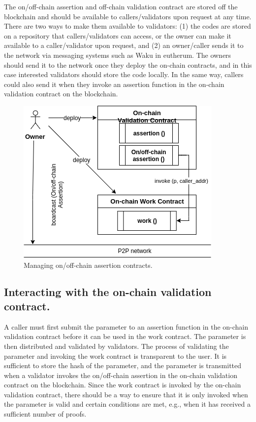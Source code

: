 \documentclass[runningheads]{llncs}
\begin{document}
The on/off-chain assertion and off-chain validation contract are stored off the blockchain and should be available to callers/validators upon request at any time. There are two ways to make them available to validators: (1) the codes are stored on a repository that callers/validators can access, or the owner can make it available to a caller/validator upon request, and (2) an owner/caller sends it to the network via messaging systems such as Waku in eutherum. The owners should send it to the network once they deploy the on-chain contracts, and in this case interested validators should store the code locally. In the same way, callers could also send it when they invoke an assertion function in the on-chain validation contract on the blockchain.

\begin{figure}
\centering
\includegraphics[scale=.8]{owner}
\caption{Managing on/off-chain assertion contracts.}
\end{figure}

\subsection{Interacting with the on-chain validation contract.}
A caller must first submit the parameter to an assertion function in the on-chain validation contract before it can be used in the work contract. The parameter is then distributed and validated by validators. The process of validating the parameter and invoking the work contract is transparent to the user. It is sufficient to store the hash of the parameter, and the parameter is transmitted when a validator invokes the on/off-chain assertion in the on-chain validation contract on the blockchain. Since the work contract is invoked by the on-chain validation contract, there should be a way to ensure that it is only invoked when the parameter is valid and certain conditions are met, e.g., when it has received a sufficient number of proofs. 
\end{document}
